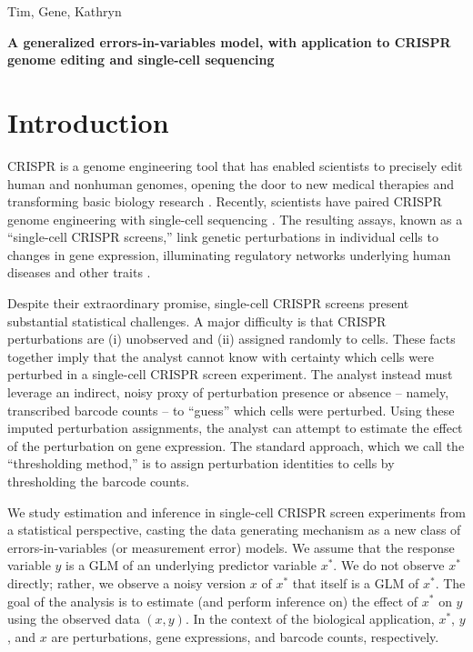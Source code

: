 \documentclass[12pt]{article}
\begin{document}
\noindent
Tim, Gene, Kathryn
\begin{center}
\textbf{A generalized errors-in-variables model, with application to CRISPR genome editing and single-cell sequencing}
\end{center}

\section{Introduction}
CRISPR is a genome engineering tool that has enabled scientists to precisely edit human and nonhuman genomes, opening the door to new medical therapies \cite{Rothgangl2021,Musunuru2021} and transforming basic biology research \cite{Przybyla2021}. Recently, scientists have paired CRISPR genome engineering with single-cell sequencing \cite{Dixit2016,Datlinger2017}. The resulting assays, known as a ``single-cell CRISPR screens,'' link genetic perturbations in individual cells to changes in gene expression, illuminating regulatory networks underlying human diseases and other traits \cite{Morris2021a}.

Despite their extraordinary promise, single-cell CRISPR screens present substantial statistical challenges. A major difficulty is that CRISPR perturbations are (i) unobserved and (ii) assigned randomly to cells. These facts together imply that the analyst cannot know with certainty which cells were perturbed in a single-cell CRISPR screen experiment. The analyst instead must leverage an indirect, noisy proxy of perturbation presence or absence -- namely, transcribed barcode counts -- to ``guess'' which cells were perturbed. Using these imputed perturbation assignments, the analyst can attempt to estimate the effect of the perturbation on gene expression. The standard approach, which we call the ``thresholding method,'' is to assign perturbation identities to cells by thresholding the barcode counts.

We study estimation and inference in single-cell CRISPR screen experiments  from a statistical perspective, casting the data generating mechanism as a new class of errors-in-variables (or measurement error) models. We assume that the response variable $y$ is a GLM of an underlying predictor variable $x^*$. We do not observe $x^*$ directly; rather, we observe a noisy version $x$ of $x^*$ that itself is a GLM of $x^*$. The goal of the analysis is to estimate (and perform inference on) the effect of $x^*$ on $y$ using the observed data $(x, y)$. In the context of the biological application, $x^*$, $y$, and $x$ are perturbations, gene expressions, and barcode counts, respectively.
\end{document}
